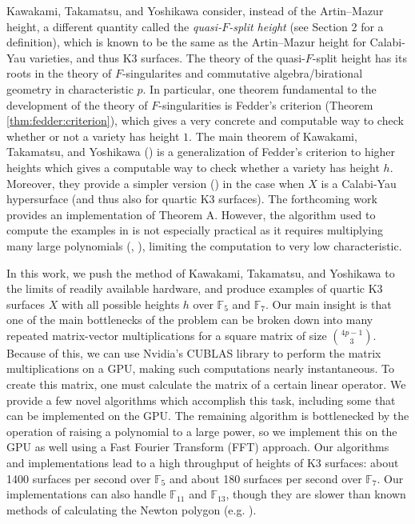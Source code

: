 Kawakami, Takamatsu, and Yoshikawa consider, 
instead of the Artin--Mazur height, a different quantity called the
\textit{quasi-\(F\)-split height} 
(see Section 2 for a definition),
which is known to be the same as the Artin--Mazur height
for Calabi-Yau varieties, and thus K3 surfaces.
The theory of the quasi-\(F\)-split height has its
roots in the theory of \(F\)-singularites and commutative
algebra/birational geometry in characteristic \(p\).
In particular, one theorem fundamental
to the development of the theory of \(F\)-singularities
is Fedder's criterion (Theorem \ref{thm:fedder:criterion}), 
which gives a very concrete and computable way to check
whether or not a variety has height \(1\).
The main theorem of Kawakami, Takamatsu, and Yoshikawa
(\cite[Theorem~A]{kty-2022-fedder})
is a generalization of Fedder's criterion
to higher heights which gives a 
computable way to check whether a variety has height \(h\).
Moreover, they provide a simpler version
(\cite[Theorem~C]{kty-2022-fedder})
in the case when \(X\) is a Calabi-Yau hypersurface
(and thus also for quartic K3 surfaces).
The forthcoming work 
\cite{fgmqt-2025-witt-vectors-macaulay2} 
provides an implementation of Theorem A.
However, the algorithm used to compute the examples in
\cite{kty-2022-fedder}
is not especially practical
as it requires multiplying many large polynomials
(\cite{takamatsu-2024-algorithm}, 
\cite{fgmqt-2025-witt-vectors-macaulay2}),
limiting the computation to
very low characteristic.



In this work, we push the method of Kawakami,
Takamatsu, and Yoshikawa to the limits of readily
available hardware, 
and produce examples of quartic K3 surfaces \(X\) with all
possible heights \(h\) 
over \(\mathbb{F}_{5}\) and \(\mathbb{F}_{7}\).
Our main insight is that one of the main
bottlenecks of the problem can be broken down 
into many repeated matrix-vector
multiplications for a square matrix of size 
\(\binom{4p-1}{3}\).
Because of this, we can use Nvidia's CUBLAS library 
\cite{nvidia-2024-cublas}
to perform the matrix multiplications
on a GPU, making such computations
nearly instantaneous.
To create this matrix, one must calculate the matrix of a
certain linear operator.
We provide a few novel algorithms which accomplish this task,
including some that can be implemented on the GPU.
The remaining algorithm is bottlenecked by the operation
of raising a polynomial to a large power, 
so we implement this on the GPU as well using 
a Fast Fourier Transform (FFT) approach.
Our algorithms and implementations lead to a high throughput
of heights of K3 surfaces: 
about 1400 surfaces per second over \(\mathbb{F}_{5}\) and
about 180 surfaces per second over \(\mathbb{F}_{7}\).
Our implementations can also handle \(\mathbb{F}_{11}\) 
and \(\mathbb{F}_{13}\), though they are slower than known methods
of calculating the Newton polygon (e.g. 
\cite{chk-2019-toric-controlled-reduction}).

